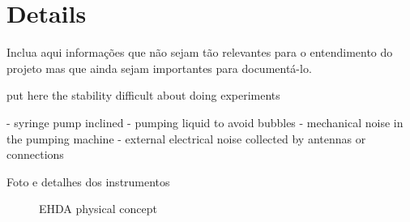 \chapter{Details}

Inclua aqui informações que não sejam tão relevantes para o entendimento do projeto mas que ainda sejam importantes para documentá-lo. 


put here the stability difficult about doing experiments

- syringe pump inclined
- pumping liquid to avoid bubbles
- mechanical noise in the pumping machine
- external electrical noise collected by antennas or connections

Foto e detalhes dos instrumentos

\begin{figure}[H]
    \centering
    \caption{EHDA physical concept }
\end{figure}




